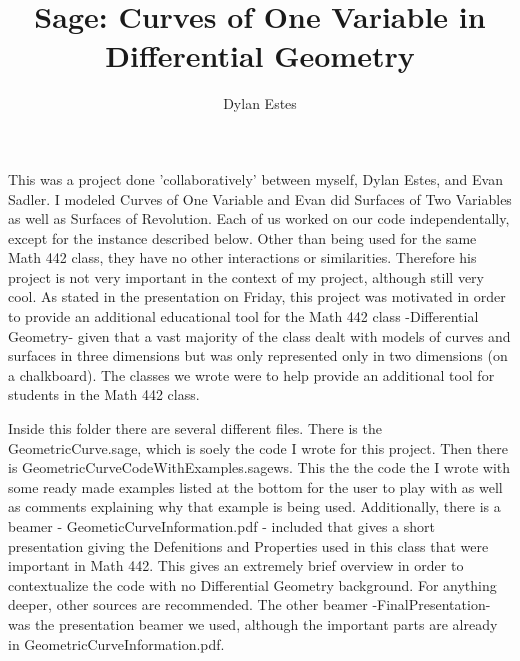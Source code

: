 \documentclass{article}
\title{Sage: Curves of One Variable in Differential Geometry}
\author{Dylan Estes}
\begin{document}
\maketitle

This was a project done 'collaboratively' between myself, Dylan Estes, and Evan Sadler. I modeled Curves of One Variable and Evan did Surfaces of Two Variables as well as Surfaces of Revolution. Each of us worked on our code independentally, except for the instance described below. Other than being used for the same Math 442 class, they have no other interactions or similarities. Therefore his project is not very important in the context of my project, although still very cool. As stated in the presentation on Friday, this project was motivated in order to provide an additional educational tool for the Math 442 class -Differential Geometry- given that a vast majority of the class dealt with models of curves and surfaces in three dimensions but was only represented only in two dimensions (on a chalkboard). The classes we wrote were to help provide an additional tool for students in the Math 442 class.

Inside this folder there are several different files. There is the GeometricCurve.sage, which is soely the code I wrote for this project. Then there is GeometricCurveCodeWithExamples.sagews. This the the code the I wrote with some ready made examples listed at the bottom for the user to play with as well as comments explaining why that example is being used. Additionally, there is a beamer - GeometicCurveInformation.pdf - included that gives a short presentation giving the Defenitions and Properties used in this class that were important in Math 442. This gives an extremely brief overview in order to contextualize the code with no Differential Geometry background. For anything deeper, other sources are recommended. The other beamer -FinalPresentation- was the presentation beamer we used, although the important parts are already in GeometricCurveInformation.pdf.
\end{document}
